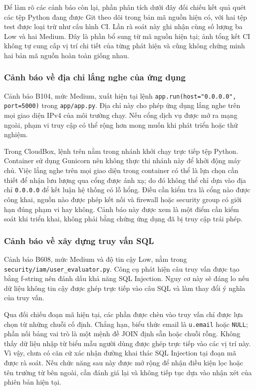 Để làm rõ các cảnh báo còn lại, phần phân tích dưới đây đối chiếu kết quả quét các tệp Python đang được Git theo dõi trong bản mã nguồn hiện có, với hai tệp test được loại trừ như cấu hình CI. Lần rà soát này ghi nhận cùng số lượng ba Low và hai Medium. Đây là phần bổ sung từ mã nguồn hiện tại; ảnh tổng kết CI không tự cung cấp vị trí chi tiết của từng phát hiện và cũng không chứng minh hai bản mã nguồn hoàn toàn giống nhau.

\subsubsection{Cảnh báo về địa chỉ lắng nghe của ứng dụng}
Cảnh báo B104, mức Medium, xuất hiện tại lệnh \texttt{app.run(host="0.0.0.0", port=5000)} trong \nolinkurl{app/app.py}. Địa chỉ này cho phép ứng dụng lắng nghe trên mọi giao diện IPv4 của môi trường chạy. Nếu cổng dịch vụ được mở ra mạng ngoài, phạm vi truy cập có thể rộng hơn mong muốn khi phát triển hoặc thử nghiệm.

Trong CloudBox, lệnh trên nằm trong nhánh khởi chạy trực tiếp tệp Python. Container sử dụng Gunicorn nên không thực thi nhánh này để khởi động máy chủ. Việc lắng nghe trên mọi giao diện trong container có thể là lựa chọn cần thiết để nhận lưu lượng qua cổng được ánh xạ; do đó không thể chỉ dựa vào địa chỉ \texttt{0.0.0.0} để kết luận hệ thống có lỗ hổng. Điều cần kiểm tra là cổng nào được công khai, nguồn nào được phép kết nối và firewall hoặc security group có giới hạn đúng phạm vi hay không. Cảnh báo này được xem là một điểm cần kiểm soát khi triển khai, không phải bằng chứng ứng dụng đã bị truy cập trái phép.

\subsubsection{Cảnh báo về xây dựng truy vấn SQL}
Cảnh báo B608, mức Medium và độ tin cậy Low, nằm trong \nolinkurl{security/iam/user_evaluator.py}. Công cụ phát hiện câu truy vấn được tạo bằng f-string nên đánh dấu khả năng SQL Injection. Nguy cơ này sẽ đáng lo nếu dữ liệu không tin cậy được ghép trực tiếp vào câu SQL và làm thay đổi ý nghĩa của truy vấn.

Qua đối chiếu đoạn mã hiện tại, các phần được chèn vào truy vấn chỉ được lựa chọn từ những chuỗi cố định. Chẳng hạn, biểu thức email là \texttt{u.email} hoặc \texttt{NULL}; phần nối bảng vai trò là một mệnh đề JOIN định sẵn hoặc chuỗi rỗng. Không thấy dữ liệu nhập từ biểu mẫu người dùng được ghép trực tiếp vào các vị trí này. Vì vậy, chưa có căn cứ xác nhận đường khai thác SQL Injection tại đoạn mã được rà soát. Nếu chức năng sau này được mở rộng để nhận điều kiện lọc hoặc tên trường từ bên ngoài, cần đánh giá lại và không tiếp tục dựa vào nhận xét của phiên bản hiện tại.


